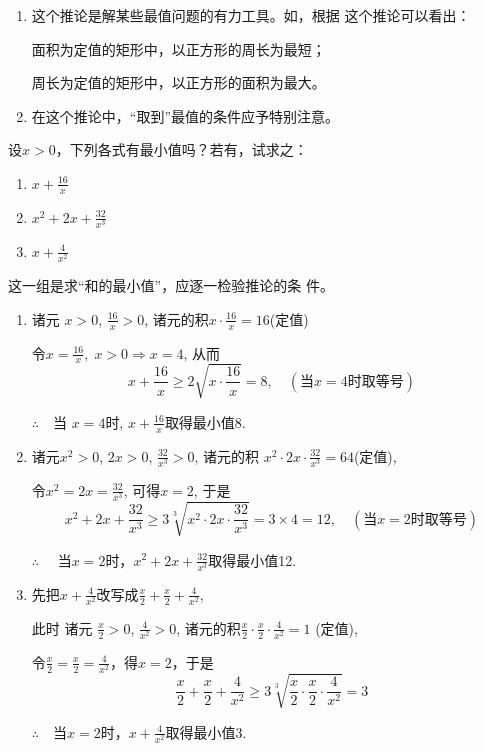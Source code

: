 \begin{note}
\begin{enumerate}
    \item 这个推论是解某些最值问题的有力工具。如，根据
    这个推论可以看出：

    面积为定值的矩形中，以正方形的周长为最短；

    周长为定值的矩形中，以正方形的面积为最大。

    \item 在这个推论中，“取到”最值的条件应予特别注意。
\end{enumerate}
\end{note}

\begin{example}
    设$x>0$，下列各式有最小值吗？若有，试求之：
\begin{multicols}{3}
\begin{enumerate}[(1)]
    \item $x+\frac{16}{x}$
    \item $x^2+2x+\frac{32}{x^3}$
    \item $x+\frac{4}{x^2}$
\end{enumerate}
\end{multicols}
\end{example}

\begin{analyze}
    这一组是求“和的最小值”，应逐一检验推论的条
件。
\end{analyze}

\begin{solution}
\begin{enumerate}[(1)]
    \item 诸元 $x> 0$, $\frac{16}{x}> 0$, 诸元的积$x\cdot\frac{16}{x}=16$(定值)
    
    令$x=\frac{16}{x},\; x>0\Longrightarrow x=4$, 从而
$$x+ \frac {16}{x}\geqslant 2 \sqrt {x\cdot \frac {16}{x}}= 8,\quad  (\text{当$x=4$时取等号})$$

$\therefore\quad $当 $x= 4$时, $x+ \frac {16}{x}$取得最小值8.

\item 诸元$x^{2}>0$, $2x>0$, $\frac{32}{x^{3}}>0$, 
诸元的积 $x^2{\cdot }2x\cdot \frac {32}{x^3}= 64$(定值),

令$x^{2}= 2x= \frac {32}{x^{3}}$, 可得$x=2$, 于是
$$x^{2}+2x+\frac{32}{x^{3}}\geqslant 3\sqrt[3]{x^{2}\cdot 2x\cdot\frac{32}{x^{3}}}=3\times4=12,\quad (\text{当$x=2$时取等号})$$

$\therefore\quad $ 当$x=2$时，$x^2+2x+\frac{32}{x^3}$取得最小值12.

\item 先把$x+ \frac {4}{x^{2}}$改写成$\frac x2+\frac x2+\frac{4}{x^{2}}$, 

此时
诸元 $\frac x2> 0$, $\frac {4}{x^2}> 0$, 
诸元的积$\frac x2\cdot \frac x2\cdot \frac {4}{x^2}= 1$ (定值),

令$\frac{x}{2}=\frac{x}{2}=\frac{4}{x^2}$，得$x=2$，于是
\[\frac{x}{2}+\frac{x}{2}+\frac{4}{x^2}\ge 3 \sqrt[3]{\frac{x}{2}\cdot \frac{x}{2}\cdot \frac{4}{x^2}}=3\]

$\therefore\quad $当$x=2$时，$x+\frac{4}{x^2}$取得最小值3.
\end{enumerate}
\end{solution}

